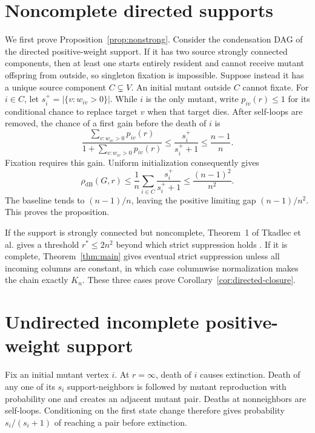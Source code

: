 \documentclass[11pt]{article}
\newcommand{\dB}{\mathrm{dB}}
\begin{document}
\section{Noncomplete directed supports}

We first prove Proposition~\ref{prop:nonstrong}.  Consider the condensation
DAG of the directed positive-weight support.  If it has two source strongly
connected components, then at least one starts entirely resident and cannot
receive mutant offspring from outside, so singleton fixation is impossible.
Suppose instead it has a unique source component $C\subsetneq V$.  An initial
mutant outside $C$ cannot fixate.  For $i\in C$, let
$s_i^+=|\{v:w_{iv}>0\}|$.  While $i$ is the only mutant, write $p_{iv}(r)\le1$
for its conditional chance to replace target $v$ when that target dies.
After self-loops are removed, the chance of a first gain before the death of
$i$ is
\[
 \frac{\sum_{v:w_{iv}>0}p_{iv}(r)}
 {1+\sum_{v:w_{iv}>0}p_{iv}(r)}
 \le \frac{s_i^+}{s_i^++1}\le\frac{n-1}{n}.
\]
Fixation requires this gain.  Uniform initialization consequently gives
\begin{equation}\label{eq:source-component-bound}
 \rho_{\dB}(G,r)
 \le\frac1n\sum_{i\in C}\frac{s_i^+}{s_i^++1}
 \le\frac{(n-1)^2}{n^2}.
\end{equation}
The baseline tends to $(n-1)/n$, leaving the positive limiting gap
$(n-1)/n^2$.  This proves the proposition.

If the support is strongly connected but noncomplete, Theorem~1 of
Tkadlec et al. gives a threshold $r^*\le2n^2$ beyond which strict suppression
holds \cite{Tkadlec2020}.  If it is complete, Theorem~\ref{thm:main} gives
eventual strict suppression unless all incoming columns are constant, in
which case columnwise normalization makes the chain exactly $K_n$.  These
three cases prove Corollary~\ref{cor:directed-closure}.

\section{Undirected incomplete positive-weight support}

Fix an initial mutant vertex $i$.  At $r=\infty$, death of $i$ causes
extinction.  Death of any one of its $s_i$ support-neighbors is followed by
mutant reproduction with probability one and creates an adjacent mutant pair.
Deaths at nonneighbors are self-loops.  Conditioning on the first state change
therefore gives probability $s_i/(s_i+1)$ of reaching a pair before
extinction.
\end{document}
